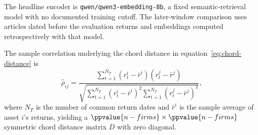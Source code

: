 The headline encoder is \texttt{qwen/qwen3-embedding-8b}, a fixed
semantic-retrieval model with no documented
training cutoff.
The later-window comparison uses articles dated before the evaluation
returns and embeddings computed retrospectively with that model.

The sample correlation underlying the chord distance in
equation~\ref{eq:chord-distance} is
\begin{equation}\label{eq:sample-correlation}
  \hat{\rho}_{ij}
  =
  \frac{
    \sum_{t=1}^{N_T} (r_t^i - \bar{r}^i)(r_t^j - \bar{r}^j)
  }{
    \sqrt{
      \sum_{t=1}^{N_T} (r_t^i - \bar{r}^i)^2
      \sum_{t=1}^{N_T} (r_t^j - \bar{r}^j)^2
    }
  },
\end{equation}
where $N_T$ is the number of common return dates and $\bar{r}^i$ is the
sample average of asset $i$'s returns, yielding a
$\ppvalue{n-firms} \times \ppvalue{n-firms}$ symmetric chord distance matrix
$D$ with zero diagonal.
